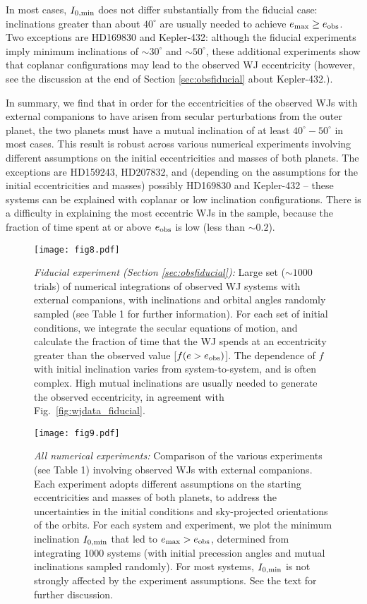 \documentclass[12pt,useAMS, usenatbib]{mn2e}
\newcommand{\Max}{{\rm max}}
\newcommand{\emax}{e_\Max}
\newcommand{\eobs}{e_{\rm obs}}
\begin{document}
In most cases, $I_{0, \rm min}$ does not differ substantially from the fiducial case: inclinations greater than about $40^\circ$ are usually needed to achieve $\emax \geq \eobs$.  Two exceptions are HD169830 and Kepler-432: although the fiducial experiments imply minimum inclinations of $\sim 30^\circ$ and $\sim 50^\circ$, these additional experiments show that coplanar configurations may lead to the observed WJ eccentricity (however, see the discussion at the end of Section \ref{sec:obsfiducial} about Kepler-432.).

In summary, we find that in order for the eccentricities of the observed WJs with external companions to have arisen from secular perturbations from the outer planet, the two planets must have a mutual inclination of at least $40^\circ - 50^\circ$ in most cases.  This result is robust across various numerical experiments involving different assumptions on the initial eccentricities and masses of both planets.  The exceptions are HD159243, HD207832, and (depending on the assumptions for the initial eccentricities and masses) possibly HD169830 and Kepler-432 -- these systems can be explained with coplanar or low inclination configurations.  There is a difficulty in explaining the most eccentric WJs in the sample, because the fraction of time spent at or above $\eobs$ is low (less than $\sim 0.2$).

\begin{figure*}
\centering 
\texttt{[image: fig8.pdf]}
\caption{{\it Fiducial experiment (Section \ref{sec:obsfiducial}):} Large set ($\sim 1000$ trials) of numerical integrations of observed WJ systems with external companions, with inclinations and orbital angles randomly sampled (see Table 1 for further information).  For each set of initial conditions, we integrate the secular equations of motion, and calculate the fraction of time that the WJ spends at an eccentricity greater than the observed value [$f (e > \eobs)$].  The dependence of $f$ with initial inclination varies from system-to-system, and is often complex.  High mutual inclinations are usually needed to generate the observed eccentricity, in agreement with Fig.~\ref{fig:wjdata_fiducial}. }
\label{fig:wjdata_fiducial_allphase}
\end{figure*}

\begin{figure*}
\centering 
\texttt{[image: fig9.pdf]}
\caption{{\it All numerical experiments: } Comparison of the various experiments (see Table 1) involving observed WJs with external companions.  Each experiment adopts different assumptions on the starting eccentricities and masses of both planets, to address the uncertainties in the initial conditions and sky-projected orientations of the orbits. For each system and experiment, we plot the minimum inclination $I_{0,\rm min}$ that led to $\emax > \eobs$, determined from integrating 1000 systems (with initial precession angles and mutual inclinations sampled randomly).  For most systems, $I_{0, \rm min}$ is not strongly affected by the experiment assumptions.  See the text for further discussion. }
\label{fig:wjdata_all_experiments}
\end{figure*}
\end{document}
